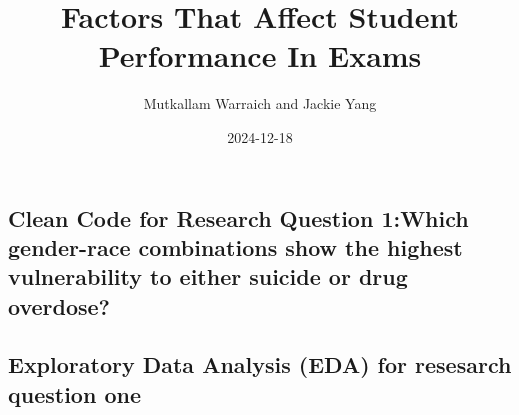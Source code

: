 \documentclass[
  letterpaper,
  DIV=11,
  numbers=noendperiod]{scrartcl}
\title{Factors That Affect Student Performance In Exams}
\author{Mutkallam Warraich and Jackie Yang}
\date{2024-12-18}
\renewcommand*\contentsname{Table of contents}
\newcommand\contentsname{Table of contents}
\begin{document}
\maketitle

\renewcommand*\contentsname{Table of contents}
{
\hypersetup{linkcolor=}
\setcounter{tocdepth}{3}
\tableofcontents
}
\subsection{Clean Code for Research Question 1:Which gender-race
combinations show the highest vulnerability to either suicide or drug
overdose?}\label{clean-code-for-research-question-1which-gender-race-combinations-show-the-highest-vulnerability-to-either-suicide-or-drug-overdose}

\subsection{Exploratory Data Analysis (EDA) for resesarch question
one}\label{exploratory-data-analysis-eda-for-resesarch-question-one}
\end{document}
